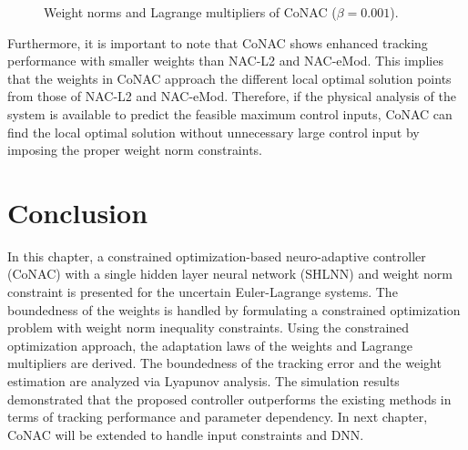 \begin{figure}[!t]      
    \centering
    \vfill
    \caption{Weight norms and Lagrange multipliers of CoNAC ($\beta=0.001$).}
    \label{chap3:fig:weight_multiplier CoNAC}
\end{figure}

Furthermore, it is important to note that CoNAC shows enhanced tracking performance with smaller weights than NAC-L2 and NAC-eMod.
This implies that the weights in CoNAC approach the different local optimal solution points from those of NAC-L2 and NAC-eMod.
Therefore, if the physical analysis of the system is available to predict the feasible maximum control inputs, CoNAC can find the local optimal solution without unnecessary large control input by imposing the proper weight norm constraints.

\section{Conclusion}

In this chapter, a constrained optimization-based neuro-adaptive controller (Co\allowbreak NAC) with a single hidden layer neural network (SHLNN) and weight norm constraint is presented for the uncertain Euler-Lagrange systems.
The boundedness of the weights is handled by formulating a constrained optimization problem with weight norm inequality constraints.
Using the constrained optimization approach, the adaptation laws of the weights and Lagrange multipliers are derived.
The boundedness of the tracking error and the weight estimation are analyzed via Lyapunov analysis.
The simulation results demonstrated that the proposed controller outperforms the existing methods in terms of tracking performance and parameter dependency.
In next chapter, CoNAC will be extended to handle input constraints and DNN.

